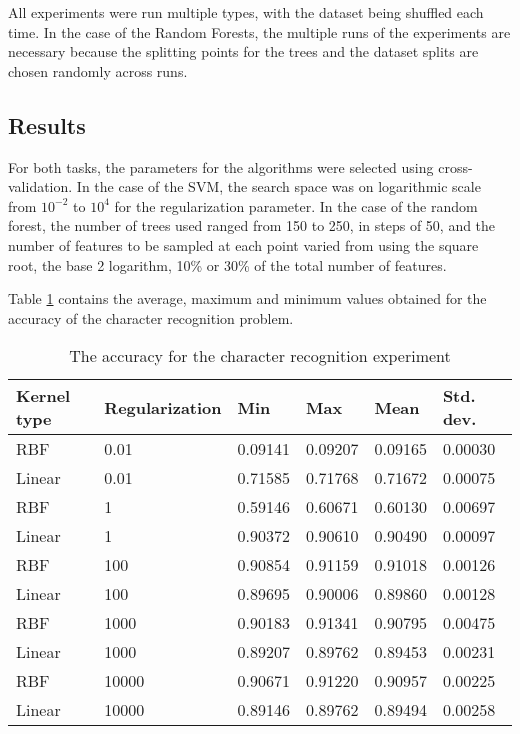 All experiments were run multiple types, with the dataset being shuffled each time. In the case of the Random Forests, the multiple runs of the experiments are necessary because the splitting points for the trees and the dataset splits are chosen randomly across runs. 
\subsection{Results}

For both tasks, the parameters for the algorithms were selected using cross-validation. In the case of the SVM, the search space was on logarithmic scale from $10^{-2}$ to $10^4$ for the regularization parameter. In the case of the random forest, the number of trees used ranged from 150 to 250, in steps of 50, and the number of features to be sampled at each point varied from using the square root, the base 2 logarithm, 10\% or 30\% of the total number of features. 

Table \ref{table:recog_values} contains the average, maximum and minimum values obtained for the accuracy of the character recognition problem.

\begin{table}[h]
\caption{The accuracy for the character recognition experiment}
\label{table:recog_values}
\begin{tabular}{llllll}
\hline
Kernel type & Regularization & Min     & Max     & Mean    & Std. dev. \\ \hline
RBF & 0.01 & 0.09141 & 0.09207 & 0.09165 & 0.00030 \\ 
Linear & 0.01 & 0.71585 & 0.71768 & 0.71672 & 0.00075 \\ 
RBF & 1 & 0.59146 & 0.60671 & 0.60130 & 0.00697 \\ 
Linear & 1 & 0.90372 & 0.90610 & 0.90490 & 0.00097 \\ 
RBF & 100 & 0.90854 & 0.91159 & 0.91018 & 0.00126 \\ 
Linear & 100 & 0.89695 & 0.90006 & 0.89860 & 0.00128 \\ 
RBF & 1000 & 0.90183 & 0.91341 & 0.90795 & 0.00475 \\ 
Linear & 1000 & 0.89207 & 0.89762 & 0.89453 & 0.00231 \\ 
RBF & 10000 & 0.90671 & 0.91220 & 0.90957 & 0.00225 \\ 
Linear & 10000 & 0.89146 & 0.89762 & 0.89494 & 0.00258 \\ \hline
\end{tabular}
\end{table}

